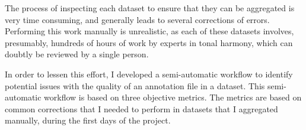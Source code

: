 


The process of inspecting each dataset to ensure that they
can be aggregated is very time consuming, and generally
leads to several corrections of errors. Performing this work
manually is unrealistic, as each of these datasets involves,
presumably, hundreds of hours of work by experts in tonal
harmony, which can doubtly be reviewed by a single person.

In order to lessen this effort, I developed a semi-automatic
workflow to identify potential issues with the quality of an
annotation file in a dataset. This semi-automatic workflow
is based on three objective metrics. The metrics are based
on common corrections that I needed to perform in datasets
that I aggregated manually, during the first days of the
project.

